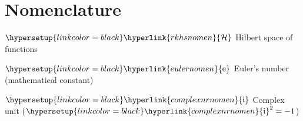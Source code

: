 \section*{Nomenclature}\label{nomenclature}
\thispagestyle{empty}


\def\mylhypertarget{rkhsnomen}
\newcommand{\hilbertspace}{\hypersetup{linkcolor=\mymathcolor}\hyperlink{\mylhypertarget}{\mathcal{H}}}%
{$\hilbertspace$ \myltab \hypertarget{\mylhypertarget}{Hilbert space of functions} \par}

\def\mylhypertarget{eulernomen}
\newcommand{\euler}{\hypersetup{linkcolor=\mymathcolor}\hyperlink{eulernomen}{\text{e}}}%
{$\euler$ \myltab \hypertarget{\mylhypertarget}{Euler's number (mathematical constant)} \par}

\def\mylhypertarget{complexnrnomen}
\newcommand{\complexunit}{\hypersetup{linkcolor=\mymathcolor}\hyperlink{\mylhypertarget}{\mathfrak{i}}}%
{$\complexunit$ \myltab \hypertarget{\mylhypertarget}{Complex unit ($\complexunit^2=-1$)} \par}


\newcommand{\myendofproof}{\hfill\text{${\Box} $}}
\newcommand{\myendofproofequation}{\hfill\text{$\tag*{\Box} $}}

\cleardoublepage